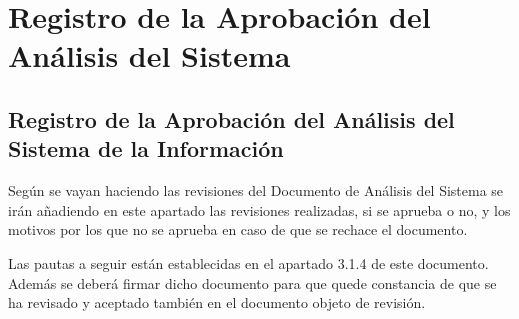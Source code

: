 \section{Registro de la Aprobación del Análisis del Sistema}
\subsection{ Registro de la Aprobación del Análisis del Sistema de la Información}
\par Según se vayan haciendo las revisiones del Documento de Análisis del Sistema se irán añadiendo en este apartado las revisiones realizadas, si se aprueba o no, y los motivos por los que no se aprueba en caso de que se rechace el documento.

Las pautas a seguir están establecidas en el apartado 3.1.4 de este documento. Además se deberá firmar dicho documento para que quede constancia de que se ha revisado y aceptado también en el documento objeto de revisión.
